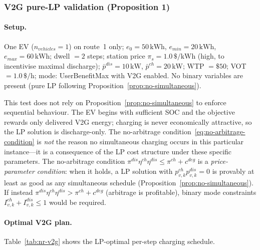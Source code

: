 \subsubsection{V2G pure-LP validation (Proposition 1)}
\label{sec:traffic-nr-v2g}

\paragraph{Setup.}
One EV ($n_{vehicles} = 1$) on route~1 only;
$e_0 = 50\,\text{kWh}$, $e_{min} = 20\,\text{kWh}$, $e_{max} = 60\,\text{kWh}$;
dwell $= 2$ steps; station price $\pi_s = 1.0\,\$/\text{kWh}$ (high, to
incentivise maximal discharge); $\bar{p}^{dis} = 10\,\text{kW}$,
$\bar{p}^{ch} = 20\,\text{kW}$; WTP $= \$50$; VOT $= 1.0\,\$/\text{h}$;
mode: UserBenefitMax with V2G enabled.
No binary variables are present (pure LP following
Proposition~\ref{prop:no-simultaneous}).

\begin{remark}
  This test does not rely on Proposition~\ref{prop:no-simultaneous} to
  enforce sequential behaviour.  The EV begins with sufficient SOC and
  the objective rewards only delivered V2G energy; charging is never
  economically attractive, so the LP solution is discharge-only.  The
  no-arbitrage condition~\eqref{eq:no-arbitrage-condition} is
  \emph{not} the reason no simultaneous charging occurs in this
  particular instance---it is a consequence of the LP cost structure
  under these specific parameters.  The no-arbitrage condition
  $\pi^{dis}\eta^{ch}\eta^{dis} \le \pi^{ch} + c^{deg}$ is a
  \emph{price-parameter condition}: when it holds, a LP solution with
  $p^{ch}_{v,k}p^{dis}_{v,k}=0$ is provably at least as good as any
  simultaneous schedule (Proposition~\ref{prop:no-simultaneous}).
  If instead $\pi^{dis}\eta^{ch}\eta^{dis} > \pi^{ch} + c^{deg}$
  (arbitrage is profitable), binary mode constraints
  $I^{ch}_{v,k}+I^{dis}_{v,k}\le 1$ would be required.
\end{remark}

\paragraph{Optimal V2G plan.}
Table~\ref{tab:nr-v2g} shows the LP-optimal per-step charging schedule.

